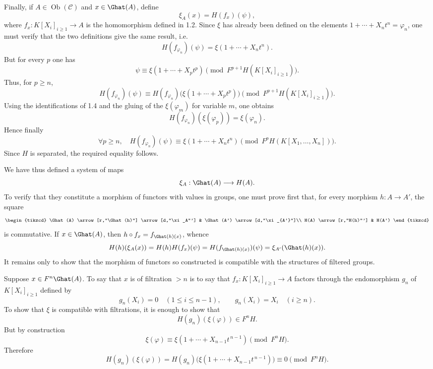 Finally, if \(A\in\operatorname{Ob}(\mathcal C)\) and \(x\in\Ghat(A)\), define
\[
  \xi_A(x)=H(f_x)(\psi),
\]
where \(f_x:K[X_i]_{i\geq 1}\to A\) is the homomorphism defined in 1.2. Since \(\xi\) has already been defined on the elements \(1+\cdots+X_nt^n=\varphi_n\), one must verify that the two definitions give the same result, i.e.
\[
  H(f_{\varphi_n})(\psi)=\xi(1+\cdots+X_nt^n).
\]
But for every \(p\) one has
\[
  \psi\equiv \xi(1+\cdots+X_pt^p)
  \pmod{F^{p+1}H(K[X_i]_{i\geq 1})}.
\]
Thus, for \(p\geq n\),
\[
  H(f_{\varphi_n})(\psi)
  \equiv
  H(f_{\varphi_n})\bigl(\xi(1+\cdots+X_pt^p)\bigr)
  \pmod{F^{p+1}H(K[X_i]_{i\geq 1})}.
\]
Using the identifications of 1.4 and the gluing of the \(\xi(\varphi_m)\) for variable \(m\), one obtains
\[
  H(f_{\varphi_n})(\xi(\varphi_p))=\xi(\varphi_n).
\]
Hence finally
\[
  \forall p\geq n,\quad
  H(f_{\varphi_n})(\psi)\equiv \xi(1+\cdots+X_nt^n)
  \pmod{F^pH(K[X_1,\ldots,X_n])}.
\]
Since \(H\) is separated, the required equality follows.

We have thus defined a system of maps
\[
  \xi_A:\Ghat(A)\longrightarrow H(A).
\]
To verify that they constitute a morphism of functors with values in groups, one must prove first that, for every morphism \(h:A\to A'\), the square
\[
\begin{tikzcd}
\Ghat(A) \arrow[r,"\Ghat(h)"] \arrow[d,"\xi_A"'] &
\Ghat(A') \arrow[d,"\xi_{A'}"]\\
H(A) \arrow[r,"H(h)"'] & H(A')
\end{tikzcd}
\]
is commutative. If \(x\in\Ghat(A)\), then \(h\circ f_x=f_{\Ghat(h)(x)}\), whence
\[
  H(h)(\xi_A(x))=H(h)H(f_x)(\psi)
  =H(f_{\Ghat(h)(x)})(\psi)=\xi_{A'}(\Ghat(h)(x)).
\]
It remains only to show that the morphism of functors so constructed is compatible with the structures of filtered groups.

Suppose \(x\in F^n\Ghat(A)\). To say that \(x\) is of filtration \(>n\) is to say that
\(f_x:K[X_i]_{i\geq 1}\to A\) factors through the endomorphism \(g_n\) of \(K[X_i]_{i\geq 1}\) defined by
\[
  g_n(X_i)=0\quad (1\leq i\leq n-1),\qquad
  g_n(X_i)=X_i\quad (i\geq n).
\]
To show that \(\xi\) is compatible with filtrations, it is enough to show that
\[
  H(g_n)(\xi(\varphi))\in F^nH.
\]
But by construction
\[
  \xi(\varphi)\equiv \xi(1+\cdots+X_{n-1}t^{\,n-1})
  \pmod{F^nH}.
\]
Therefore
\[
  H(g_n)(\xi(\varphi))
  =H(g_n)\bigl(\xi(1+\cdots+X_{n-1}t^{\,n-1})\bigr)
  \equiv 0\pmod{F^nH}.
\]

